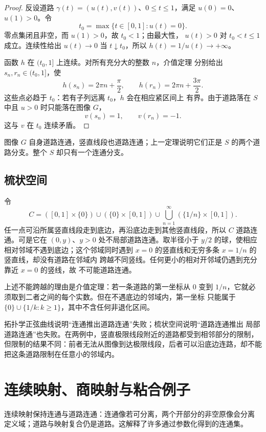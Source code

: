 \begin{proof}
反设道路 \(\gamma(t)=(u(t),v(t))\)、\(0\le t\le1\)，满足
\(u(0)=0\)、\(u(1)>0\)。令
\[
 t_0=\max\{t\in[0,1]:u(t)=0\}.
\]
零点集闭且非空，而 \(u(1)>0\)，故 \(t_0<1\)；由最大性，
\(u(t)>0\) 对 \(t_0<t\le1\) 成立。连续性给出
\(u(t)\to0\) 当 \(t\downarrow t_0\)，所以
\(h(t)=1/u(t)\to+\infty\)。

函数 \(h\) 在 \((t_0,1]\) 上连续。对所有充分大的整数 \(n\)，介值定理
分别给出 \(s_n,r_n\in(t_0,1]\)，使
\[
 h(s_n)=2\pi n+\frac{\pi}{2},\qquad
 h(r_n)=2\pi n+\frac{3\pi}{2}.
\]
这些点必趋于 \(t_0\)：若有子列远离 \(t_0\)，\(h\) 会在相应紧区间上
有界。由于道路落在 \(S\) 中且 \(u>0\) 时只能落在图像 \(G\)，
\[
 v(s_n)=1,\qquad v(r_n)=-1.
\]
这与 \(v\) 在 \(t_0\) 连续矛盾。
\end{proof}

图像 \(G\) 自身道路连通，竖直线段也道路连通；上一定理说明它们正是
\(S\) 的两个道路分支。整个 \(S\) 却只有一个连通分支。

\subsection{梳状空间}

令
\[
 C=([0,1]\times\{0\})\cup(\{0\}\times[0,1])
 \cup\bigcup_{n=1}^{\infty}(\{1/n\}\times[0,1]).
\]
任一点可沿所属竖直线段走到底边，再沿底边走到其他竖直线段，所以 \(C\)
道路连通。可是它在 \((0,y)\)、\(y>0\) 处不局部道路连通。取半径小于
\(y/2\) 的球，使相应相对邻域不遇到底边；这个邻域同时遇到
\(x=0\) 的竖直线和无穷多条 \(x=1/n\) 的竖直线，却没有道路在邻域内
跨越不同竖线。任何更小的相对开邻域仍遇到充分靠近 \(x=0\) 的竖线，故
不可能道路连通。

上述不能跨越的理由是介值定理：若一条道路的第一坐标从 \(0\) 变到
\(1/n\)，它就必须取到二者之间的每个实数。但在不遇底边的邻域内，第一坐标
只能属于 \(\{0\}\cup\{1/k:k\ge1\}\)，其中不含任何非退化区间。

拓扑学正弦曲线说明“连通推出道路连通”失败；梳状空间说明“道路连通推出
局部道路连通”也失败。在两例中，竖直极限线段附近的道路都受到相邻部分的限制，
但限制的结果不同：前者无法从图像到达极限线段，后者可以沿底边连路，却不能
把这条道路限制在任意小的邻域内。

\section{连续映射、商映射与粘合例子}

连续映射保持连通与道路连通：连通像若可分离，两个开部分的非空原像会分离
定义域；道路与映射复合仍是道路。这解释了许多通过参数化得到的连通集。


